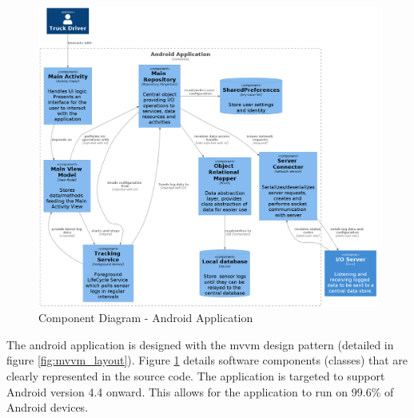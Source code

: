 \begin{figure}
\centering
\includegraphics[width=6in]{../diag/android_component.png}
\caption{Component Diagram - Android Application}
\label{fig:android_component}
\end{figure}

The android application is designed with the \ac{mvvm} design pattern (detailed in figure \ref{fig:mvvm_layout}).
Figure \ref{fig:android_component} details software components (classes) that are clearly represented in the source code.
The application is targeted to support Android version 4.4 onward.
This allows for the application to run on 99.6\% of Android devices.

